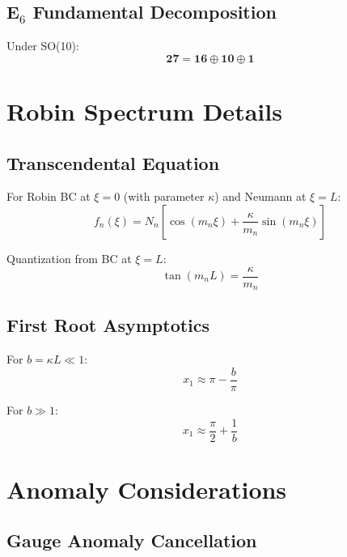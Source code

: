 \documentclass[11pt,a4paper]{article}
\begin{document}
\subsection{E$_6$ Fundamental Decomposition}

Under SO(10):
\begin{equation}
  \mathbf{27} = \mathbf{16} \oplus \mathbf{10} \oplus \mathbf{1}
  \label{eq:app-27-decomp}
\end{equation}

\section{Robin Spectrum Details}
\label{app:robin}

\subsection{Transcendental Equation}

For Robin BC at $\xi=0$ (with parameter $\kappa$) and Neumann at $\xi=L$:
\begin{equation}
  f_n(\xi) = N_n \left[ \cos(m_n \xi) + \frac{\kappa}{m_n} \sin(m_n \xi) \right]
  \label{eq:app-robin-mode}
\end{equation}

Quantization from BC at $\xi=L$:
\begin{equation}
  \tan(m_n L) = \frac{\kappa}{m_n}
  \label{eq:app-robin-quant}
\end{equation}

\subsection{First Root Asymptotics}

For $b = \kappa L \ll 1$:
\begin{equation}
  x_1 \approx \pi - \frac{b}{\pi}
  \label{eq:app-x1-small-b}
\end{equation}

For $b \gg 1$:
\begin{equation}
  x_1 \approx \frac{\pi}{2} + \frac{1}{b}
  \label{eq:app-x1-large-b}
\end{equation}

\section{Anomaly Considerations}
\label{app:anomaly}

\subsection{Gauge Anomaly Cancellation}
\end{document}
